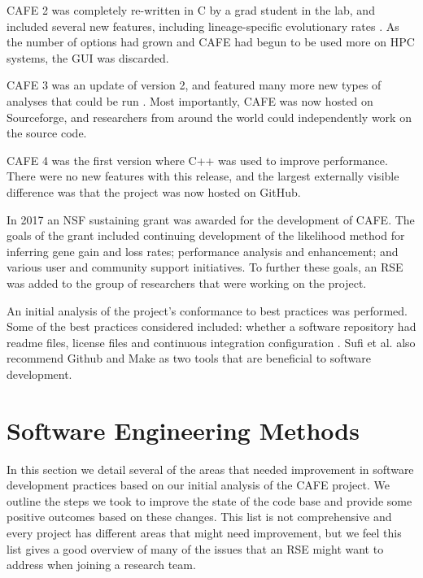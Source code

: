 \documentclass[acmtog, authorversion]{acmart}
\begin{document}
CAFE 2 was completely re-written in C by a grad student in the lab, and included several new features, including lineage-specific evolutionary rates \cite{hahn2007gene}. As the number of options had grown and CAFE had begun to be used more on HPC systems, the GUI was discarded.

CAFE 3 was an update of version 2, and featured many more new types of analyses that could be run \cite{han2013estimating}. Most importantly, CAFE was now hosted on Sourceforge, and researchers from around the world could independently work on the source code.

CAFE 4 was the first version where C++ was used to improve performance. There were no new features with this release, and the largest externally visible difference was that the project was now hosted on GitHub. 

In 2017 an NSF sustaining grant was awarded for the development of CAFE. The goals of the grant included continuing development of the likelihood method for inferring gene gain and loss rates; performance analysis and enhancement; and various user and community support initiatives. To further these goals, an RSE was added to the group of researchers that were working on the project.

An initial analysis of the project's conformance to best practices was performed. Some of the best practices considered included: whether a software repository had readme files, license files and continuous integration configuration \cite{Sufi2014}. Sufi et al. also recommend Github and Make as two tools that are beneficial to software development.


\section{Software Engineering Methods} \label{sec:softwareng}
In this section we detail several of the areas that needed improvement in software development practices based on our initial analysis of the CAFE project. We outline the steps we took to improve the state of the code base and provide some positive outcomes based on these changes. This list is not comprehensive and every project has different areas that might need improvement, but we feel this list gives a good overview of many of the issues that an RSE might want to address when joining a research team.
\end{document}
